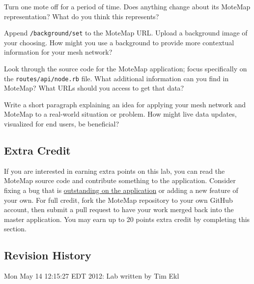 \documentclass{article}
\begin{document}
 Turn one mote off for a period of time. Does anything change about its MoteMap representation? What do you think this represents?

 Append \verb!/background/set! to the MoteMap URL. Upload a background image of your choosing. How might you use a background to provide more contextual information for your mesh network?

 Look through the source code for the MoteMap application; focus specifically on the \verb!routes/api/node.rb! file. What additional information can you find in MoteMap? What URLs should you access to get that data?

 Write a short paragraph explaining an idea for applying your mesh network and MoteMap to a real-world situation or problem. How might live data updates, visualized for end users, be beneficial?

\subsection*{Extra Credit}

If you are interested in earning extra points on this lab, you can read the MoteMap source code and contribute something to the application. Consider fixing a bug that is \href{https://github.com/lithium3141/MoteMap/issues}{outstanding on the application} or adding a new feature of your own. For full credit, fork the MoteMap repository to your own GitHub account, then submit a pull request to have your work merged back into the master application. You may earn up to 20 points extra credit by completing this section.



\subsection*{Revision History}
\begin{itemize*}
\item Mon May 14 12:15:27 EDT 2012: Lab written by Tim Ekl
\end{itemize*}
\end{document}
